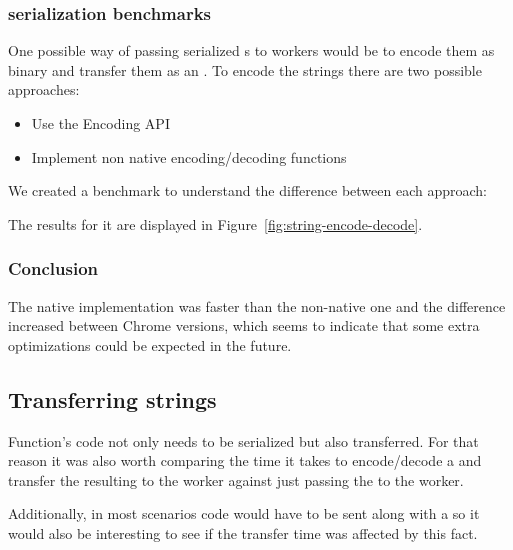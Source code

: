 
\subsubsection{\tstring{} serialization benchmarks}
One possible way of passing serialized \tfunction{}s to workers would be to encode them as binary and transfer them as an \tabuffer{}. To encode the strings there are two possible approaches:
\begin{itemize}
  \item Use the Encoding API\cite{encoding-api}
  \item Implement non native encoding/decoding functions
\end{itemize}

We created a benchmark to understand the difference between each approach:

The results for it are displayed in Figure~\ref{fig:string-encode-decode}.

\subsubsection{Conclusion}
The native implementation was faster than the non-native one and the difference increased between Chrome versions, which seems to indicate that some extra optimizations could be expected in the future.

\subsection{Transferring strings}
Function's code not only needs to be serialized but also transferred. For that reason it was also worth comparing the time it takes to encode/decode a \tstring{} and transfer the resulting \tabuffer{} to the worker against just passing the \tstring{} to the worker.

Additionally, in most scenarios code would have to be sent along with a \ttarray{} so it would also be interesting to see if the transfer time was affected by this fact.

